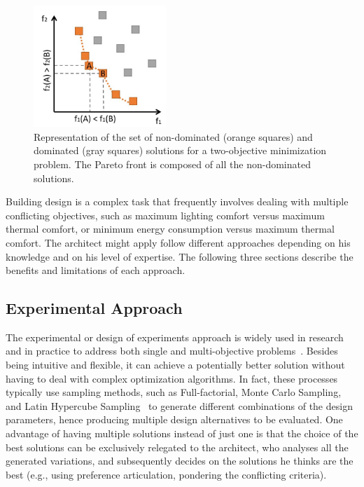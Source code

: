 \begin{figure}
\centering
\includegraphics[width=5cm]{Images/Background/pareto-front.JPG}
\caption[Example of a bi-objective optimization problem]{Representation of the set of non-dominated (orange squares) and dominated (gray squares) solutions for a two-objective minimization problem. The Pareto front is composed of all the non-dominated solutions.}
\label{fig:paretofrontier}
\end{figure}

Building design is a complex task that frequently involves dealing with multiple conflicting objectives, such as maximum lighting comfort versus maximum thermal comfort, or minimum energy consumption versus maximum thermal comfort. The architect might apply follow different approaches depending on his knowledge and on his level of expertise. The following three sections describe the benefits and limitations of each approach. 

\subsection{Experimental Approach}

	The experimental or design of experiments approach is widely used in research and in practice to address both single and multi-objective problems~\cite{Fang2017}. Besides being intuitive and flexible, it can achieve a potentially better solution without having to deal with complex optimization algorithms. In fact, these processes typically use sampling methods, such as Full-factorial, Monte Carlo Sampling, and Latin Hypercube Sampling~\cite{Giunta2003DOE} to generate different combinations of the design parameters, hence producing multiple design alternatives to be evaluated. One advantage of having multiple solutions instead of just one is that the choice of the best solutions can be exclusively relegated to the architect, who analyses all the generated variations, and subsequently decides on the solutions he thinks are the best (e.g., using preference articulation, pondering the conflicting criteria).	

